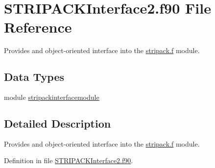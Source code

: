 \hypertarget{STRIPACKInterface2_8f90}{\section{S\+T\+R\+I\+P\+A\+C\+K\+Interface2.\+f90 File Reference}
\label{STRIPACKInterface2_8f90}
}


Provides and object-\/oriented interface into the \hyperlink{stripack_8f}{stripack.\+f} module.  


\subsection*{Data Types}
\begin{DoxyCompactItemize}
\item 
module \hyperlink{classstripackinterfacemodule}{stripackinterfacemodule}
\end{DoxyCompactItemize}


\subsection{Detailed Description}
Provides and object-\/oriented interface into the \hyperlink{stripack_8f}{stripack.\+f} module. 



Definition in file \hyperlink{STRIPACKInterface2_8f90_source}{S\+T\+R\+I\+P\+A\+C\+K\+Interface2.\+f90}.

